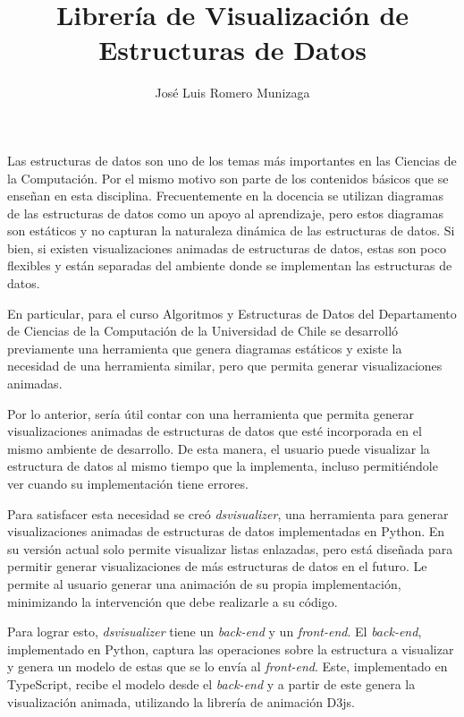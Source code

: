 \documentclass{umemoria}
\author{José Luis Romero Munizaga}
\title{Librería de Visualización de Estructuras de Datos}
\begin{document}
\frontmatter
\maketitle

\begin{resumen}
Las estructuras de datos son uno de los temas más importantes en las Ciencias de la Computación.
Por el mismo motivo son parte de los contenidos básicos que se enseñan en esta disciplina.
Frecuentemente en la docencia se utilizan diagramas de las estructuras de datos como un apoyo al aprendizaje, pero estos diagramas son estáticos y no capturan la naturaleza dinámica de las estructuras de datos.
Si bien, si existen visualizaciones animadas de estructuras de datos, estas son poco flexibles y están separadas del ambiente donde se implementan las estructuras de datos.

En particular, para el curso Algoritmos y Estructuras de Datos del Departamento de Ciencias de la Computación de la Universidad de Chile se desarrolló previamente una herramienta que genera diagramas estáticos y existe la necesidad de una herramienta similar, pero que permita generar visualizaciones animadas.

Por lo anterior, sería útil contar con una herramienta que permita generar visualizaciones animadas de estructuras de datos que esté incorporada en el mismo ambiente de desarrollo.
De esta manera, el usuario puede visualizar la estructura de datos al mismo tiempo que la implementa, incluso permitiéndole ver cuando su implementación tiene errores.

Para satisfacer esta necesidad se creó \textit{dsvisualizer}, una herramienta para generar visualizaciones animadas de estructuras de datos implementadas en Python.
En su versión actual solo permite visualizar listas enlazadas, pero está diseñada para permitir generar visualizaciones de más estructuras de datos en el futuro.
Le permite al usuario generar una animación de su propia implementación, minimizando la intervención que debe realizarle a su código.

Para lograr esto, \textit{dsvisualizer} tiene un \textit{back-end} y un \textit{front-end}. El \textit{back-end}, implementado en Python, captura las operaciones sobre la estructura a visualizar y genera un modelo de estas que se lo envía al \textit{front-end}. Este, implementado en TypeScript, recibe el modelo desde el \textit{back-end} y a partir de este genera la visualización animada, utilizando la librería de animación D3js.


\end{resumen}
\end{document}
